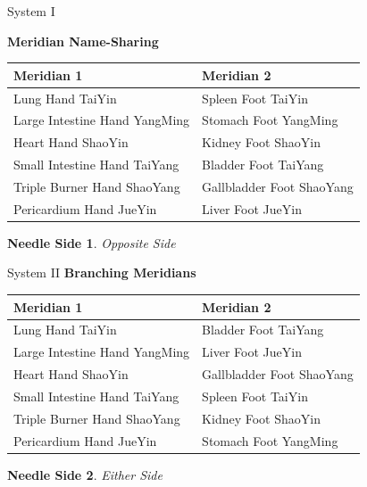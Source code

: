 \documentclass{beamer}
\begin{document}
\begin{frame}{System I}
  \newtheorem{ns}{Needle Side}
  \textbf{\Large Meridian Name-Sharing}

  \begin{table}[]
    \begin{tabular}{@{}ll@{}}
      \toprule
      Meridian 1                    & Meridian 2                \\ \midrule
      Lung Hand TaiYin              & Spleen Foot TaiYin        \\
      Large Intestine Hand YangMing & Stomach Foot YangMing     \\
      Heart Hand ShaoYin            & Kidney Foot ShaoYin       \\
      Small Intestine Hand TaiYang  & Bladder Foot TaiYang      \\
      Triple Burner Hand ShaoYang   & Gallbladder Foot ShaoYang \\
      Pericardium Hand JueYin       & Liver Foot JueYin         \\ \bottomrule
    \end{tabular}
  \end{table}
  \begin{ns}
    Opposite Side
  \end{ns}
\end{frame}

\begin{frame}{System II}
  \textbf{\Large Branching Meridians}
  \begin{table}[]
    \begin{tabular}{@{}ll@{}}
      \toprule
      Meridian 1                    & Meridian 2                 \\ \midrule
      Lung Hand TaiYin              & Bladder Foot TaiYang       \\
      Large Intestine Hand YangMing & Liver Foot JueYin          \\
      Heart Hand ShaoYin            & Gallbladder  Foot ShaoYang \\
      Small Intestine Hand TaiYang  & Spleen Foot TaiYin         \\
      Triple Burner Hand ShaoYang   & Kidney Foot ShaoYin        \\
      Pericardium Hand JueYin       & Stomach Foot YangMing      \\ \bottomrule
    \end{tabular}
  \end{table}

  \begin{ns}
    Either Side
  \end{ns}
\end{frame}
\end{document}
